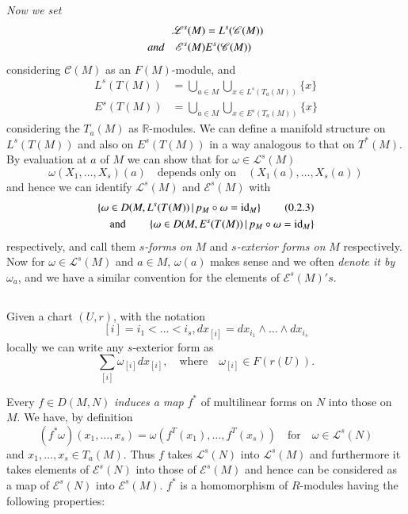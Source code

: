 {\em Now we set}
\begin{align*}
\mathscr{L}^{s}(M) &= L^{s}(\mathscr{C}(M))\\
\text{\em and}\quad \mathscr{E}^{s}(M) & E^{s}(\mathscr{C}(M))
\end{align*}
considering $\mathscr{C}(M)$ as an $F(M)$-module, and 
\begin{align*}
L^{s}(T(M)) &= \bigcup_{a\in M}\bigcup_{x\in L^{s}(T_{a}(M))}\{x\}\\
E^{s}(T(M)) &= \bigcup_{a\in M}\bigcup_{x\in E^{s}(T_{a}(M))}\{x\}
\end{align*}
considering \pageoriginale the $T_{a}(M)$ as $\mathbb{R}$-modules. We
can define a 
manifold structure on $L^{s}(T(M))$ and also on $E^{s}(T(M))$ in a way
analogous to that on $T^{\ast}(M)$. By evaluation at $a$ of $M$ we can
show that for $\omega\in\mathscr{L}^{s}(M)$
$$
\omega(X_{1},\ldots,X_{s})(a)\quad\text{depends only on}\quad
(X_{1}(a),\ldots,X_{s}(a)) 
$$
and hence we can identify $\mathscr{L}^{s}(M)$ and
$\mathscr{E}^{s}(M)$ with
\begin{align*}
\left\{\omega \in D(M,L^{s}(T(M))\,|\, p_{M}\circ\omega
= \operatorname{id}_{M}\right\}\tag{0.2.3}\label{chap0:0.2.3}\\ 
\text{and}\qquad \left\{\omega\in
D(M,E^{s}(T(M)) \,|\, p_{M}\circ\omega=\operatorname{id}_{M}\right\} 
\end{align*}
respectively, and call them {\em $s$-forms on} $M$ and {\em
  $s$-exterior forms on} $M$ respectively. Now for $\omega\in
\mathscr{L}^{s}(M)$ and $a\in M$, $\omega(a)$ makes sense and we often
        {\em denote it by} $\omega_{a}$, and we have a similar
        convention for the elements of $\mathscr{E}^{s}(M)'s$.

\setcounter{subsection}{3}
\subsection{}\label{chap0:0.2.4}

Given a chart $(U,r)$, with the notation
$$
[i]=i_{1}<\ldots<i_{s}, dx_{[i]}=dx_{i_{1}}\wedge \ldots \wedge dx_{i_{s}}
$$
locally we can write any $s$-exterior form as
\begin{equation*}\label{chap0:0.2.5}
\sum_{[i]}\omega_{[i]}dx_{[i]},\quad\text{where}\quad \omega_{[i]}\in
F(r(U)).\tag{0.2.5} 
\end{equation*}

Every $f\in D(M,N)$ {\em induces a map} $f^{\ast}$ of multilinear
forms on $N$ into those on $M$. We have, by definition
\begin{equation*}\label{chap0:0.2.6}
(f^{\ast}\omega)(x_{1},\ldots,x_{s})
  = \omega(f^{T}(x_{1}), \ldots,f^{T}(x_{s}))\quad\text{for}\quad  
  \omega\in \mathscr{L}^{s}(N)\tag{0.2.6}
\end{equation*}
and $x_{1},\ldots,x_{s}\in T_{a}(M)$. Thus $f$ takes
$\mathscr{L}^{s}(N)$ into $\mathscr{L}^{s}(M)$ and furthermore it
takes elements of $\mathscr{E}^{s}(N)$ into those of
$\mathscr{E}^{s}(M)$ and hence can be considered as a map of
$\mathscr{E}^{s}(N)$ into $\mathscr{E}^{s}(M)$. $f^{\ast}$ is
a \pageoriginale homomorphism of $R$-modules having the following
properties: 


